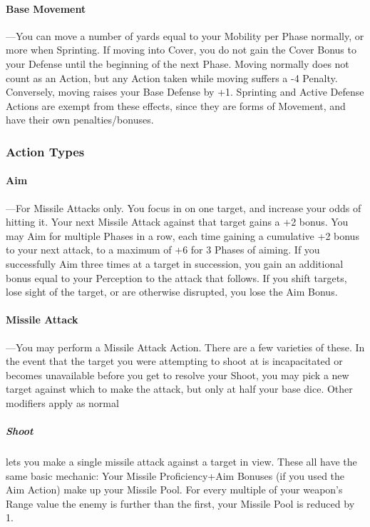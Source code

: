 \documentclass[oneside,11pt,english]{book}
\begin{document}
\paragraph{Base Movement}---\quad You can move a number of yards equal to your
Mobility per Phase normally, or more when Sprinting. If moving into Cover, you
do not gain the Cover Bonus to your Defense until the beginning of the next
Phase. Moving normally does not count as an Action, but any Action taken while
moving suffers a -4 Penalty. Conversely, moving raises your Base Defense by +1.
Sprinting and Active Defense Actions are exempt from these effects, since they
are forms of Movement, and have their own penalties/bonuses.
\subsubsection{Action Types}
\paragraph{Aim}---\quad For Missile Attacks only. You focus in on one target,
and increase your odds of hitting it. Your next Missile Attack against that
target gains a +2 bonus. You may Aim for multiple Phases in a row, each time
gaining a cumulative +2 bonus to your next attack, to a maximum of +6 for 3
Phases of aiming. If you successfully Aim three times at a target in succession,
you gain an additional bonus equal to your Perception to the attack that
follows. If you shift targets, lose sight of the target, or are otherwise
disrupted, you lose the Aim Bonus. 

\paragraph{Missile Attack}\label{sec:missile-attack}
---\quad You may perform a Missile Attack Action. There are a few varieties of
these. In the event that the target you were attempting to shoot at is
incapacitated or becomes unavailable before you get to resolve your Shoot, you
may pick a new target against which to make the attack, but only at half your
base dice. Other modifiers apply as normal 
\subparagraph{Shoot} lets you make a single missile attack against a target in
view. These all have the same basic mechanic: Your Missile Proficiency+Aim
Bonuses (if you used the Aim Action) make up your Missile Pool. For every
multiple of your weapon’s Range value the enemy is further than the first, your
Missile Pool is reduced by 1. 
\end{document}
